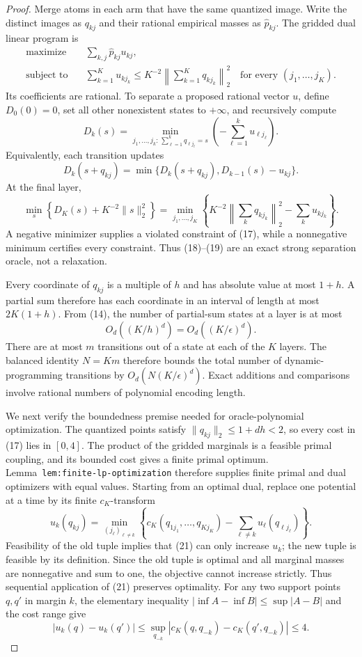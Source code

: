 \documentclass{article}
\begin{document}
\begin{proof}
Merge atoms in each arm that have the same quantized image. Write the distinct images as \(q_{kj}\) and their rational empirical masses as \(\widehat p_{kj}\). The gridded dual linear program is
\[
\begin{aligned}
\text{maximize}\quad&\sum_{k,j}\widehat p_{kj}u_{kj},\\
\text{subject to}\quad&\sum_{k=1}^Ku_{k j_k}
\le K^{-2}\left\|\sum_{k=1}^Kq_{k j_k}\right\|_2^2
\quad\text{for every }(j_1,\ldots,j_K).
\end{aligned}
\tag{17}
\]
Its coefficients are rational. To separate a proposed rational vector \(u\), define \(D_0(0)=0\), set all other nonexistent states to \(+\infty\), and recursively compute
\[
D_k(s)=\min_{j_1,\ldots,j_k:\,\sum_{\ell=1}^kq_{\ell j_\ell}=s}
\left(-\sum_{\ell=1}^ku_{\ell j_\ell}\right).
\tag{18}
\]
Equivalently, each transition updates
\[
D_k(s+q_{kj})
=\min\{D_k(s+q_{kj}),D_{k-1}(s)-u_{kj}\}.
\]
At the final layer,
\[
\min_s\left\{D_K(s)+K^{-2}\|s\|_2^2\right\}
=\min_{j_1,\ldots,j_K}
\left\{K^{-2}\left\|\sum_kq_{k j_k}\right\|_2^2-\sum_ku_{k j_k}\right\}.
\tag{19}
\]
A negative minimizer supplies a violated constraint of (17), while a nonnegative minimum certifies every constraint. Thus (18)--(19) are an exact strong separation oracle, not a relaxation.

Every coordinate of \(q_{kj}\) is a multiple of \(h\) and has absolute value at most \(1+h\). A partial sum therefore has each coordinate in an interval of length at most \(2K(1+h)\). From (14), the number of partial-sum states at a layer is at most
\[
O_d((K/h)^d)=O_d((K/\epsilon)^d).
\tag{20}
\]
There are at most \(m\) transitions out of a state at each of the \(K\) layers. The balanced identity \(N=Km\) therefore bounds the total number of dynamic-programming transitions by \(O_d(N(K/\epsilon)^d)\). Exact additions and comparisons involve rational numbers of polynomial encoding length.

We next verify the boundedness premise needed for oracle-polynomial optimization. The quantized points satisfy \(\|q_{kj}\|_2\le1+dh<2\), so every cost in (17) lies in \([0,4]\). The product of the gridded marginals is a feasible primal coupling, and its bounded cost gives a finite primal optimum. Lemma~\texttt{lem:finite-lp-optimization} therefore supplies finite primal and dual optimizers with equal values. Starting from an optimal dual, replace one potential at a time by its finite \(c_K\)-transform
\[
u_k(q_{kj})
=\min_{(j_\ell)_{\ell\ne k}}
\left\{c_K(q_{1j_1},\ldots,q_{Kj_K})-
\sum_{\ell\ne k}u_\ell(q_{\ell j_\ell})\right\}.
\tag{21}
\]
Feasibility of the old tuple implies that (21) can only increase \(u_k\); the new tuple is feasible by its definition. Since the old tuple is optimal and all marginal masses are nonnegative and sum to one, the objective cannot increase strictly. Thus sequential application of (21) preserves optimality. For any two support points \(q,q'\) in margin \(k\), the elementary inequality \(|\inf A-\inf B|\le\sup|A-B|\) and the cost range give
\[
|u_k(q)-u_k(q')|
\le\sup_{q_{-k}}|c_K(q,q_{-k})-c_K(q',q_{-k})|
\le4.
\tag{22}
\]


\end{proof}
\end{document}
